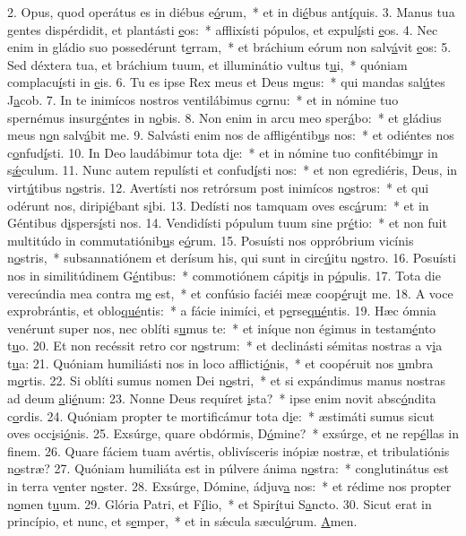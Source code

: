 2. Opus, quod operátus es in diébus e\uline{ó}rum,~* et in di\uline{é}bus ant\uline{í}quis.
3. Manus tua gentes dispérdidit, et plantásti \uline{e}os:~* afflixísti pópulos, et expul\uline{í}sti \uline{e}os.
4. Nec enim in gládio suo possedérunt t\uline{e}rram,~* et bráchium eórum non salv\uline{á}vit \uline{e}os:
5. Sed déxtera tua, et bráchium tuum, et illuminátio vultus t\uline{u}i,~* quóniam complacu\uline{í}sti in \uline{e}is.
6. Tu es ipse Rex meus et Deus m\uline{e}us:~* qui mandas sal\uline{ú}tes J\uline{a}cob.
7. In te inimícos nostros ventilábimus c\uline{o}rnu:~* et in nómine tuo spernémus insurg\uline{é}ntes in n\uline{o}bis.
8. Non enim in arcu meo sper\uline{á}bo:~* et gládius meus n\uline{o}n salv\uline{á}bit me.
9. Salvásti enim nos de affligéntib\uline{u}s nos:~* et odiéntes nos c\uline{o}nfud\uline{í}sti.
10. In Deo laudábimur tota d\uline{i}e:~* et in nómine tuo confitébim\uline{u}r in s\uline{ǽ}culum.
11. Nunc autem repulísti et confud\uline{í}sti nos:~* et non egrediéris, Deus, in virt\uline{ú}tibus n\uline{o}stris.
12. Avertísti nos retrórsum post inimícos n\uline{o}stros:~* et qui odérunt nos, diripi\uline{é}bant s\uline{i}bi.
13. Dedísti nos tamquam oves esc\uline{á}rum:~* et in Géntibus d\uline{i}spers\uline{í}sti nos.
14. Vendidísti pópulum tuum sine pr\uline{é}tio:~* et non fuit multitúdo in commutatiónib\uline{u}s e\uline{ó}rum.
15. Posuísti nos oppróbrium vicínis n\uline{o}stris,~* subsannatiónem et derísum his, qui sunt in circ\uline{ú}itu n\uline{o}stro.
16. Posuísti nos in similitúdinem G\uline{é}ntibus:~* commotiónem cápit\uline{i}s in p\uline{ó}pulis.
17. Tota die verecúndia mea contra m\uline{e} est,~* et confúsio faciéi meæ coop\uline{é}ru\uline{i}t me.
18. A voce exprobrántis, et oblo\uline{qué}ntis:~* a fácie inimíci, et p\uline{e}rse\uline{qué}ntis.
19. Hæc ómnia venérunt super nos, nec oblíti s\uline{u}mus te:~* et iníque non égimus in testam\uline{é}nto t\uline{u}o.
20. Et non recéssit retro cor n\uline{o}strum:~* et declinásti sémitas nostras a v\uline{i}a t\uline{u}a:
21. Quóniam humiliásti nos in loco afflicti\uline{ó}nis,~* et coopéruit nos \uline{u}mbra m\uline{o}rtis.
22. Si oblíti sumus nomen Dei n\uline{o}stri,~* et si expándimus manus nostras ad deum \uline{a}li\uline{é}num:
23. Nonne Deus requíret \uline{i}sta?~* ipse enim novit absc\uline{ó}ndita c\uline{o}rdis.
24. Quóniam propter te mortificámur tota d\uline{i}e:~* æstimáti sumus sicut oves occ\uline{i}si\uline{ó}nis.
25. Exsúrge, quare obdórmis, D\uline{ó}mine?~* exsúrge, et ne rep\uline{é}llas in f\uline{i}nem.
26. Quare fáciem tuam avértis, oblivísceris inópiæ nostræ, et tribulatiónis n\uline{o}stræ?
27. Quóniam humiliáta est in púlvere ánima n\uline{o}stra:~* conglutinátus est in terra v\uline{e}nter n\uline{o}ster.
28. Exsúrge, Dómine, ádjuv\uline{a} nos:~* et rédime nos propter n\uline{o}men t\uline{u}um.
29. Glória Patri, et F\uline{í}lio,~* et Spir\uline{í}tui S\uline{a}ncto.
30. Sicut erat in princípio, et nunc, et s\uline{e}mper,~* et in sǽcula sæcul\uline{ó}rum. \uline{A}men.
